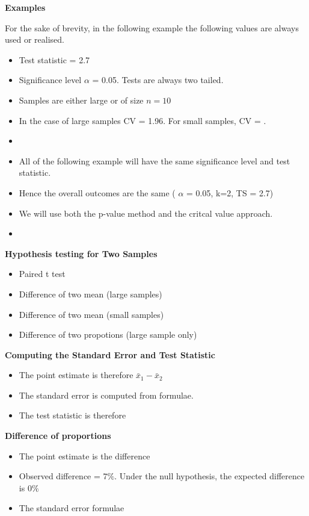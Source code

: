 \documentclass[]{report}
\begin{document}
{{\textbf{Examples}

For the sake of brevity, in the following example the following values are always used or realised.

\begin{itemize}
\item Test statistic  = 2.7
\item Significance level $\alpha$ = 0.05. Tests are always two tailed.
\item Samples are either large or of size $n = 10$
\item In the case of large samples CV = 1.96. For small samples, CV = .
\item
\end{itemize}

\begin{itemize}
\item All of the following example will have the same significance level and test statistic.
\item Hence the overall outcomes are the same ( $\alpha$ = 0.05, k=2, TS = 2.7)
\item We will use both the p-value method and the critcal value approach.
\item 
\end{itemize}


\textbf{Hypothesis testing for Two Samples}

\begin{itemize}
\item Paired t test
\item Difference of two mean (large samples)
\item Difference of two mean (small samples)
\item Difference of two propotions (large sample only)
\end{itemize}


\textbf{Computing the Standard Error and Test Statistic }
\begin{itemize}
\item The point estimate is therefore $\bar{x}_1 -\bar{x}_2$
\item The standard error is computed from formulae.
\item The test statistic is therefore 
\end{itemize}

\textbf{Difference of proportions}

\begin{itemize}
\item The point estimate is the difference 
\item Observed difference  = $7\%$. Under the null hypothesis, the expected difference is $0\%$
\item The standard error formulae
\end{itemize}





}}
\end{document}

